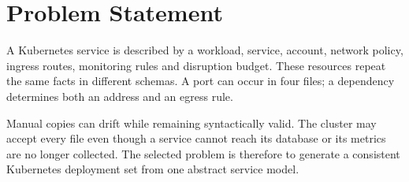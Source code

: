 \section{Problem Statement}

A Kubernetes service is described by a workload, service, account, network
policy, ingress routes, monitoring rules and disruption budget. These resources
repeat the same facts in different schemas. A port can occur in four files; a
dependency determines both an address and an egress rule.

Manual copies can drift while remaining syntactically valid. The cluster may
accept every file even though a service cannot reach its database or its metrics
are no longer collected. The selected problem is therefore to generate a
consistent Kubernetes deployment set from one abstract service model.
